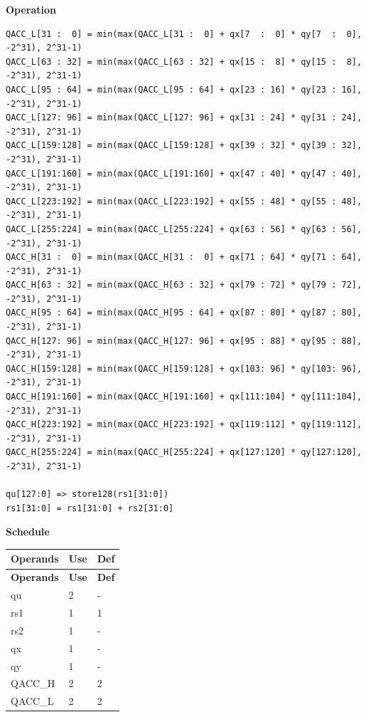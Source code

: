 \textbf{Operation}\\
\begin{lstlisting}
QACC_L[31 :  0] = min(max(QACC_L[31 :  0] + qx[7  :  0] * qy[7  :  0], -2^31), 2^31-1)
QACC_L[63 : 32] = min(max(QACC_L[63 : 32] + qx[15 :  8] * qy[15 :  8], -2^31), 2^31-1)
QACC_L[95 : 64] = min(max(QACC_L[95 : 64] + qx[23 : 16] * qy[23 : 16], -2^31), 2^31-1)
QACC_L[127: 96] = min(max(QACC_L[127: 96] + qx[31 : 24] * qy[31 : 24], -2^31), 2^31-1)
QACC_L[159:128] = min(max(QACC_L[159:128] + qx[39 : 32] * qy[39 : 32], -2^31), 2^31-1)
QACC_L[191:160] = min(max(QACC_L[191:160] + qx[47 : 40] * qy[47 : 40], -2^31), 2^31-1)
QACC_L[223:192] = min(max(QACC_L[223:192] + qx[55 : 48] * qy[55 : 48], -2^31), 2^31-1)
QACC_L[255:224] = min(max(QACC_L[255:224] + qx[63 : 56] * qy[63 : 56], -2^31), 2^31-1)
QACC_H[31 :  0] = min(max(QACC_H[31 :  0] + qx[71 : 64] * qy[71 : 64], -2^31), 2^31-1)
QACC_H[63 : 32] = min(max(QACC_H[63 : 32] + qx[79 : 72] * qy[79 : 72], -2^31), 2^31-1)
QACC_H[95 : 64] = min(max(QACC_H[95 : 64] + qx[87 : 80] * qy[87 : 80], -2^31), 2^31-1)
QACC_H[127: 96] = min(max(QACC_H[127: 96] + qx[95 : 88] * qy[95 : 88], -2^31), 2^31-1)
QACC_H[159:128] = min(max(QACC_H[159:128] + qx[103: 96] * qy[103: 96], -2^31), 2^31-1)
QACC_H[191:160] = min(max(QACC_H[191:160] + qx[111:104] * qy[111:104], -2^31), 2^31-1)
QACC_H[223:192] = min(max(QACC_H[223:192] + qx[119:112] * qy[119:112], -2^31), 2^31-1)
QACC_H[255:224] = min(max(QACC_H[255:224] + qx[127:120] * qy[127:120], -2^31), 2^31-1)

qu[127:0] => store128(rs1[31:0])
rs1[31:0] = rs1[31:0] + rs2[31:0]
\end{lstlisting}

\textbf{Schedule}\\
\begin{longtable}[c]{|l|l|l|}
    \hline
    \rowcolor{lightgray}
    \textbf{Operands} & \textbf{Use} & \textbf{Def} \\\hline
    \endfirsthead
    \hline
    \rowcolor{lightgray}
     \textbf{Operands} & \textbf{Use} & \textbf{Def} \\\hline
    \endhead
    \hline
    \endfoot

    qu & 2 & - \\\hline
    rs1 & 1 & 1 \\\hline
    rs2 & 1 & - \\\hline
     qx & 1 & - \\\hline
     qy & 1 & - \\\hline
     QACC\_H & 2 & 2 \\\hline
     QACC\_L & 2 & 2

\end{longtable}

